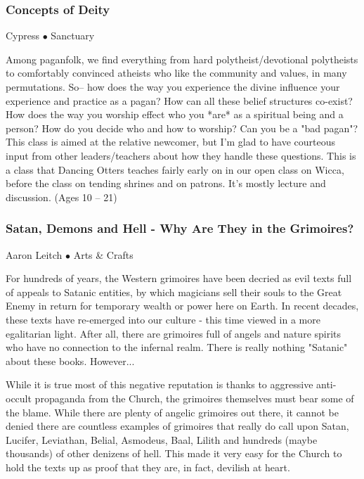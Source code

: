 \subsubsection{Concepts of Deity}
\label{Sat-Cypress3}
{\small Cypress $\bullet$  Sanctuary}

 Among paganfolk, we find everything from hard polytheist/devotional polytheists to comfortably convinced atheists who like the community and values, in many permutations. So-- how does the way you experience the divine influence your experience and practice as a pagan? How can all these belief structures co-exist? How does the way you worship effect who you *are* as a spiritual being and a person? How do you decide who and how to worship? Can you be a "bad pagan"? This class is aimed at the relative newcomer, but I'm glad to have courteous input from other leaders/teachers about how they handle these questions. This is a class that Dancing Otters teaches fairly early on in our open class on Wicca, before the class on tending shrines and on patrons. It's mostly lecture and discussion. {\small (Ages 10 -- 21)}

\subsubsection{Satan, Demons and Hell - Why Are They in the Grimoires?}
\label{Sat-Leitch3}
{\small Aaron Leitch $\bullet$  Arts \& Crafts}

 For hundreds of years, the Western grimoires have been decried as evil texts full of appeals to Satanic entities, by which magicians sell their souls to the Great Enemy in return for temporary wealth or power here on Earth.  In recent decades, these texts have re-emerged into our culture - this time viewed in a more egalitarian light.  After all, there are grimoires full of angels and nature spirits who have no connection to the infernal realm.  There is really nothing "Satanic" about these books.  However...

While it is true most of this negative reputation is thanks to aggressive anti-occult propaganda from the Church, the grimoires themselves must bear some of the blame.  While there are plenty of angelic grimoires out there, it cannot be denied there are countless examples of grimoires that really do call upon Satan, Lucifer, Leviathan, Belial, Asmodeus, Baal, Lilith and hundreds (maybe thousands) of other denizens of hell.  This made it very easy for the Church to hold the texts up as proof that they are, in fact, devilish at heart.

